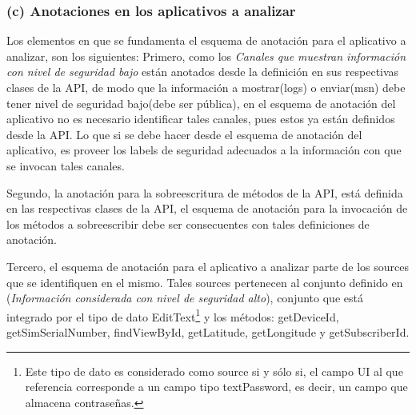 \subsubsection{(c) Anotaciones en los aplicativos a analizar}
Los elementos en que se fundamenta el esquema de anotación para el aplicativo a
analizar, son los siguientes:\newline 
Primero, como los \textit{Canales que muestran
información con nivel de seguridad bajo} están anotados desde la definición en
sus respectivas clases de la API, de modo que la información a mostrar(logs) o
enviar(msn) debe tener nivel de seguridad bajo(debe ser pública), en el esquema
de anotación del aplicativo no es necesario identificar tales canales, pues
estos ya están definidos desde la API. Lo que si se debe hacer desde el esquema
de anotación del aplicativo, es proveer los labels de seguridad adecuados a la
información con que se invocan tales canales.

Segundo, la anotación para la sobreescritura de métodos de la API, está definida
en las respectivas clases de la API, el esquema de anotación para la invocación
de los métodos a sobreescribir debe ser consecuentes con tales definiciones de
anotación.

Tercero, el esquema de anotación para el aplicativo a analizar parte de
los sources que se identifiquen en el mismo. Tales sources pertenecen al conjunto
definido en (\textit{Información considerada con nivel de seguridad alto}),
conjunto que está integrado por el tipo de dato EditText\footnote{Este tipo de
dato es considerado como source si y sólo si, el campo UI al que referencia
corresponde a un campo tipo textPassword, es decir, un campo que almacena
contraseñas.} y los métodos: getDeviceId, getSimSerialNumber, findViewById,
getLatitude, getLongitude y getSubscriberId.

